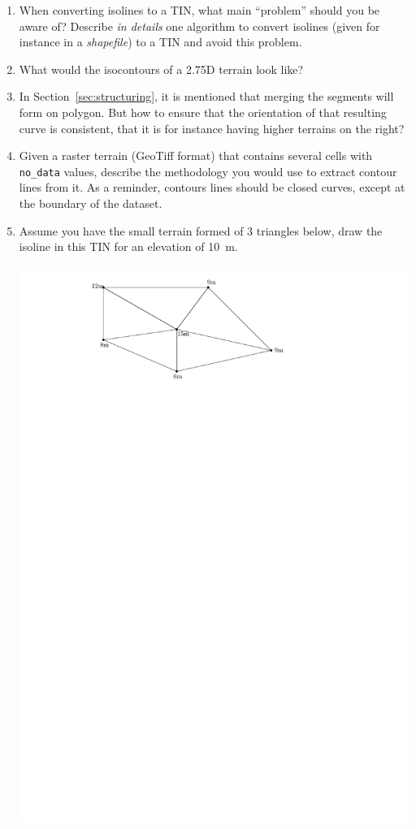 \begin{enumerate}
  \item When converting isolines to a TIN, what main ``problem'' should you be aware of? Describe \emph{in details} one algorithm to convert isolines (given for instance in a \emph{shapefile}) to a TIN and avoid this problem.
  \item What would the isocontours of a 2.75D terrain look like?
  \item In Section~\ref{sec:structuring}, it is mentioned that merging the segments will form on polygon. But how to ensure that the orientation of that resulting curve is consistent, that it is for instance having higher terrains on the right?
  \item Given a raster terrain (GeoTiff format) that contains several cells with \texttt{no\_data} values, describe the methodology you would use to extract contour lines from it. As a reminder, contours lines should be closed curves, except at the boundary of the dataset.
  \item Assume you have the small terrain formed of 3 triangles below, draw the isoline in this TIN for an elevation of \qty{10}{\m}.
  \\ \\
  \includegraphics[width=0.5\linewidth]{figs/threetr.pdf}
\end{enumerate}